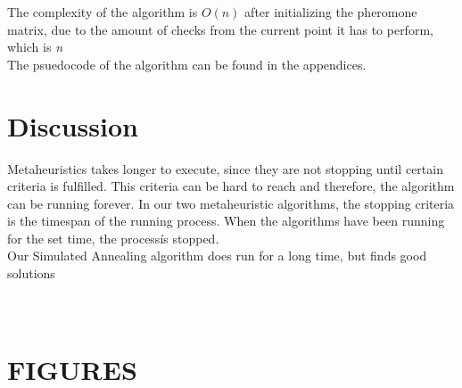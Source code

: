 \documentclass[12pt]{article}
\begin{document}
The complexity of the algorithm is $O(n)$ after initializing the pheromone matrix, due to the amount of checks from the current point 
it has to perform, which is \textit{n}\\

The psuedocode of the algorithm can be found in the appendices.

\section{Discussion}
Metaheuristics takes longer to execute, since they are not stopping until certain criteria is fulfilled. This criteria can be hard to reach and therefore, 
the algorithm can be running forever. In our two metaheuristic algorithms, the stopping criteria is the timespan of the running process. When the algorithms have been 
running for the set time, the process\' is stopped. \\
Our Simulated Annealing algorithm does run for a long time, but finds good solutions

\section{\\ FIGURES}

\newpage



\end{document}
